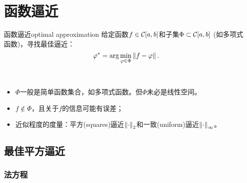 \chapter{函数逼近}
\label{chap:optimal approximation}

\begin{definition}
    {函数逼近}{optimal approximation}
    给定函数$f\in\mathcal C[a,b]$和子集$\Phi\subset\mathcal C[a,b]$ (如多项式函数)，寻找最佳逼近：
    \begin{equation}
        \varphi^*=\arg\min_{\varphi\in\Phi}\left\lVert f-\varphi\right\rVert.
    \end{equation}
\end{definition}

\begin{remark}
    ~
    \begin{itemize}
        \item $\Phi$一般是简单函数集合，如多项式函数。但$\Phi$未必是线性空间。
        \item $f\notin\Phi$，且关于$f$的信息可能有误差；
        \item 近似程度的度量：平方(squares)逼近$\left\lVert\cdot\right\rVert_2$和一致(uniform)逼近$\left\lVert\cdot\right\rVert_\infty$。
    \end{itemize}
\end{remark}

\section{最佳平方逼近}
\label{sec:optimal squares approximation}

\subsection{法方程}

